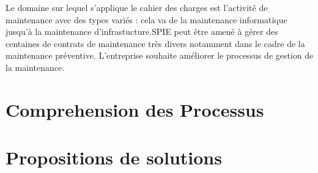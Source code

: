 \documentclass[]{scrartcl}
\begin{document}
Le domaine sur lequel s'applique le cahier des charges est l'activité de maintenance avec des types variés : cela va de la maintenance informatique jusqu'à la maintenance d'infrastucture.SPIE peut être amené à gérer des centaines de contrats de maintenance très divers notamment dans le cadre de la maintenance préventive. L'entreprise souhaite améliorer le processus de gestion de la maintenance.  


\section{Comprehension des Processus}
\section{Propositions de solutions}
\end{document}
